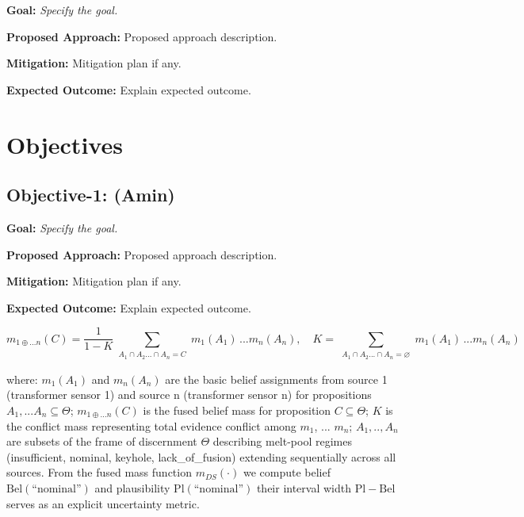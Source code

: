 \documentclass[11pt]{article}
\begin{document}
\noindent
\textbf{\textcolor{FlyersRed}{{Goal:}}}
\textit{Specify the goal.}



\noindent
\textbf{\textcolor{FlyersRed}{{Proposed Approach:}}}
Proposed approach description.

\noindent
\textbf{\textcolor{FlyersRed}{{Mitigation:}}}
Mitigation plan if any.


\textbf{\textcolor{FlyersRed}{{Expected Outcome:}}}
Explain expected outcome. 

\section{Objectives}
\label{sec:objectives}
\subsection{Objective-1: (Amin)}
\label{sec:object1}


\noindent
\textbf{\textcolor{FlyersRed}{{Goal:}}}
\textit{Specify the goal.}



\noindent
\textbf{\textcolor{FlyersRed}{{Proposed Approach:}}}
Proposed approach description.

\noindent
\textbf{\textcolor{FlyersRed}{{Mitigation:}}}
Mitigation plan if any.


\textbf{\textcolor{FlyersRed}{{Expected Outcome:}}}
Explain expected outcome. 

\begin{equation}\label{eq:example_equation}
  m_{1\oplus...n}(C) 
  = \frac{1}{1 - K} \sum_{\substack{A_1 \cap A_2 ... \cap A_n = C}} m_1(A_1)\,...m_n(A_n),
  \quad
  K = \sum_{\substack{A_1 \cap A_2 ... \cap A_n = \varnothing}} m_1(A_1)\,...m_n(A_n)
\end{equation}

\noindent where: $m_1(A_1)$ and $m_n(A_n)$ are the basic belief assignments from source 1 (transformer sensor 1) and source n (transformer sensor n) for propositions $A_1, ... A_n \subseteq \Theta$; $m_{1\oplus...n}(C)$ is the fused belief mass for proposition $C \subseteq \Theta$; $K$ is the conflict mass representing total evidence conflict among $m_1$, ... $m_n$; $A_1, .., A_n$ are subsets of the frame of discernment $\Theta$ describing melt-pool regimes (insufficient, nominal, keyhole, lack\_of\_fusion) extending sequentially across all sources. From the fused mass function $m_{DS}(\cdot)$ we compute belief $\mathrm{Bel}(\text{``nominal''})$ and plausibility $\mathrm{Pl}(\text{``nominal''})$ their interval width $\mathrm{Pl}-\mathrm{Bel}$ serves as an explicit uncertainty metric.
\end{document}
